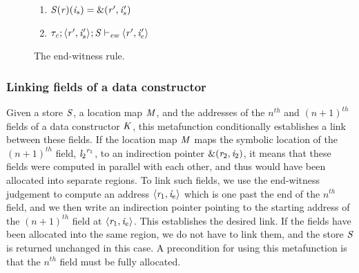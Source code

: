 {\begin{figure}[h!]
\begin{enumerate}%

\item $\mathit{S}(\mathit{r})(\mathit{i}_s) = \text{\&}(\mathit{r}',\mathit{i}_s')$

\item $\mathit{\tau_c};\langle \mathit{r}', \mathit{i}_{s}' \rangle ^{};\mathit{S} \vdash_{\textit{ew}} \langle \mathit{r}', \mathit{i}_{e}' \rangle ^{}$
\end{enumerate}

\caption{The end-witness rule.}
\label{fig:end-witness}
\end{figure}
}



\subsubsection{Linking fields of a data constructor}
\label{subsec:appendix-linking-fields}


Given a store $\mathit{S}$, a location map $\mathit{M}$, and the addresses of the
$n^{th}$ and $(n+1)^{th}$ fields of a data constructor $\mathit{K}$,
this metafunction conditionally establishes a link between these fields.
%
If the location map $\mathit{M}$ maps the symbolic location of the $(n+1)^{th}$ field,
${\mathit{l}_2}^{\mathit{r}_1}$, to an indirection pointer $\text{\&}(\mathit{r}_2,\mathit{i}_2)$,
it means that these fields were computed in parallel with each other,
and thus would have been allocated into separate regions.
%
To link such fields, we use the end-witness judgement to compute an address
$\langle \mathit{r}_1, \mathit{i}_e \rangle ^{}$ which is one past the end of the $n^{th}$ field,
and we then write an indirection pointer pointing to the starting address of the $(n+1)^{th}$
field at $\langle \mathit{r}_1, \mathit{i}_e \rangle ^{}$.
%
This establishes the desired link.
%
If the fields have been allocated into the same region, we do not have to link them,
and the store $\mathit{S}$ is returned unchanged in this case.
%
A precondition for using this metafunction is that the $n^{th}$ field must be fully
allocated.
%


